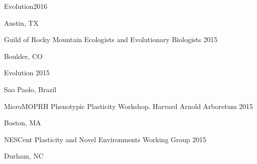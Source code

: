 \documentclass[12pt,english]{article}
\begin{document}
\hspace*{1.0em}Evolution\hfill 2016 \par
\hspace*{2.0em}Austin, TX \par\vspace{0.5ex}

\hspace*{1.0em}Guild of Rocky Mountain Ecologists and Evolutionary Biologists \hfill 2015 \par
\hspace*{2.0em}Boulder, CO \par\vspace{0.5ex}

\hspace*{1.0em}Evolution \hfill 2015 \par
\hspace*{2.0em}Sao Paolo, Brazil \par\vspace{0.5ex}

\hspace*{1.0em}MicroMOPRH Phenotypic Plasticity Workshop. Harvard Arnold Arboretum  \hfill 2015 \par
\hspace*{2.0em}Boston, MA  \par\vspace{0.5ex}

\hspace*{1.0em}NESCent Plasticity and Novel Environments Working Group  \hfill 2015 \par
\hspace*{2.0em}Durham, NC \par\vspace{0.5ex}

\end{document}

